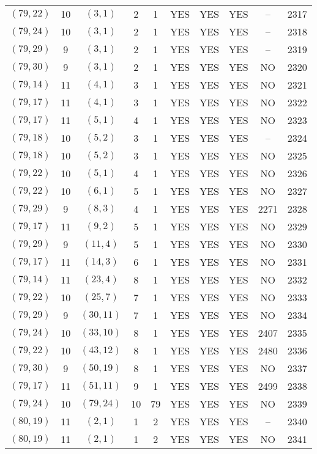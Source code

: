 \begin{longtable}{|c|c|c|c|c|c|c|c|c|c|}
$(79, 22)$ & 10 & $(3, 1)$ & 2 & 1 & YES & YES & YES & -- & 2317\\
$(79, 24)$ & 10 & $(3, 1)$ & 2 & 1 & YES & YES & YES & -- & 2318\\
$(79, 29)$ & 9 & $(3, 1)$ & 2 & 1 & YES & YES & YES & -- & 2319\\
$(79, 30)$ & 9 & $(3, 1)$ & 2 & 1 & YES & YES & YES & NO & 2320\\
$(79, 14)$ & 11 & $(4, 1)$ & 3 & 1 & YES & YES & YES & NO & 2321\\
$(79, 17)$ & 11 & $(4, 1)$ & 3 & 1 & YES & YES & YES & NO & 2322\\
$(79, 17)$ & 11 & $(5, 1)$ & 4 & 1 & YES & YES & YES & NO & 2323\\
$(79, 18)$ & 10 & $(5, 2)$ & 3 & 1 & YES & YES & YES & -- & 2324\\
$(79, 18)$ & 10 & $(5, 2)$ & 3 & 1 & YES & YES & YES & NO & 2325\\
$(79, 22)$ & 10 & $(5, 1)$ & 4 & 1 & YES & YES & YES & NO & 2326\\
$(79, 22)$ & 10 & $(6, 1)$ & 5 & 1 & YES & YES & YES & NO & 2327\\
$(79, 29)$ & 9 & $(8, 3)$ & 4 & 1 & YES & YES & YES & 2271 & 2328\\
$(79, 17)$ & 11 & $(9, 2)$ & 5 & 1 & YES & YES & YES & NO & 2329\\
$(79, 29)$ & 9 & $(11, 4)$ & 5 & 1 & YES & YES & YES & NO & 2330\\
$(79, 17)$ & 11 & $(14, 3)$ & 6 & 1 & YES & YES & YES & NO & 2331\\
$(79, 14)$ & 11 & $(23, 4)$ & 8 & 1 & YES & YES & YES & NO & 2332\\
$(79, 22)$ & 10 & $(25, 7)$ & 7 & 1 & YES & YES & YES & NO & 2333\\
$(79, 29)$ & 9 & $(30, 11)$ & 7 & 1 & YES & YES & YES & NO & 2334\\
$(79, 24)$ & 10 & $(33, 10)$ & 8 & 1 & YES & YES & YES & 2407 & 2335\\
$(79, 22)$ & 10 & $(43, 12)$ & 8 & 1 & YES & YES & YES & 2480 & 2336\\
$(79, 30)$ & 9 & $(50, 19)$ & 8 & 1 & YES & YES & YES & NO & 2337\\
$(79, 17)$ & 11 & $(51, 11)$ & 9 & 1 & YES & YES & YES & 2499 & 2338\\
$(79, 24)$ & 10 & $(79, 24)$ & 10 & 79 & YES & YES & YES & NO & 2339\\
$(80, 19)$ & 11 & $(2, 1)$ & 1 & 2 & YES & YES & YES & -- & 2340\\
$(80, 19)$ & 11 & $(2, 1)$ & 1 & 2 & YES & YES & YES & NO & 2341\\

\end{longtable}
